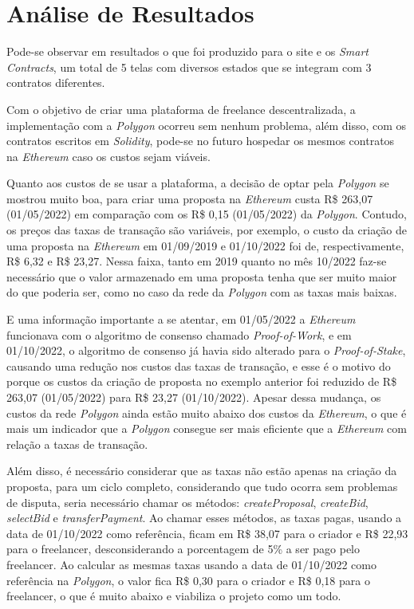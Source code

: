 \chapter{Análise de Resultados}

Pode-se observar em resultados o que foi produzido para o site e os \textit{Smart Contracts}, um total de 5 telas com diversos estados que se integram com 3 contratos diferentes.

Com o objetivo de criar uma plataforma de freelance descentralizada, a implementação com a \textit{Polygon} ocorreu sem nenhum problema, além disso, com os contratos escritos em \textit{Solidity}, pode-se no futuro hospedar os mesmos contratos na \textit{Ethereum} caso os custos sejam viáveis.

Quanto aos custos de se usar a plataforma, a decisão de optar pela \textit{Polygon} se mostrou muito boa, para criar uma proposta na \textit{Ethereum} custa R\$ 263,07 (01/05/2022) em comparação com os R\$ 0,15 (01/05/2022) da \textit{Polygon}. Contudo, os preços das taxas de transação são variáveis, por exemplo, o custo da criação de uma proposta na \textit{Ethereum} em 01/09/2019 e 01/10/2022 foi de, respectivamente, R\$ 6,32 e R\$ 23,27. Nessa faixa, tanto em 2019 quanto no mês 10/2022 faz-se necessário que o valor armazenado em uma proposta tenha que ser muito maior do que poderia ser, como no caso da rede da \textit{Polygon} com as taxas mais baixas.

E uma informação importante a se atentar, em 01/05/2022 a \textit{Ethereum} funcionava com o algoritmo de consenso chamado \textit{Proof-of-Work}, e em 01/10/2022, o algoritmo de consenso já havia sido alterado para o \textit{Proof-of-Stake}, causando uma redução nos custos das taxas de transação, e esse é o motivo do porque os custos da criação de proposta no exemplo anterior foi reduzido de R\$ 263,07 (01/05/2022) para R\$ 23,27 (01/10/2022). Apesar dessa mudança, os custos da rede \textit{Polygon} ainda estão muito abaixo dos custos da \textit{Ethereum}, o que é mais um indicador que a \textit{Polygon} consegue ser mais eficiente que a \textit{Ethereum} com relação a taxas de transação. 

Além disso, é necessário considerar que as taxas não estão apenas na criação da proposta, para um ciclo completo, considerando que tudo ocorra sem problemas de disputa, seria necessário chamar os métodos: \textit{createProposal}, \textit{createBid}, \textit{selectBid} e \textit{transferPayment}. Ao chamar esses métodos, as taxas pagas,  usando a data de 01/10/2022 como referência, ficam em R\$ 38,07 para o criador e R\$ 22,93 para o freelancer, desconsiderando a porcentagem de 5\% a ser pago pelo freelancer. Ao calcular as mesmas taxas usando a data de 01/10/2022 como referência na \textit{Polygon}, o valor fica R\$ 0,30 para o criador e R\$ 0,18 para o freelancer, o que é muito abaixo e viabiliza o projeto como um todo.

